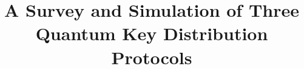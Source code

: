 \documentclass[conference]{IEEEtran}
\begin{document}
%
\title{A Survey and Simulation of Three Quantum Key Distribution Protocols}

\author{
}


%








\maketitle
\end{document}
